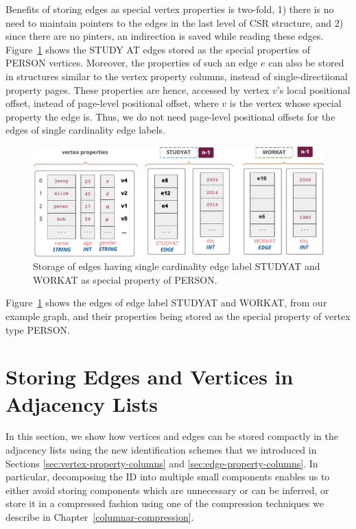 Benefits of storing edges as special vertex properties is two-fold, 1) there is no need to maintain pointers to the edges in the last level of CSR structure, and 2) since there are no pinters, an indirection is saved while reading these edges. Figure~\ref{fig:single-cardinality-cols} shows the STUDY AT edges stored as the special properties of PERSON vertices. Moreover, the properties of such an edge $e$ can also be stored in structures similar to the vertex property columns, instead of single-directiional property pages. These properties are hence, accessed by vertex $v$'s local positional offset, instead of page-level positional offset, where $v$ is the vertex whose special property the edge is. Thus, we do not need page-level positional offsets for the edges of single cardinality edge labels.

\begin{figure}
	\hfill\includegraphics[scale=0.78]{img/single-cardinality-cols}\hspace*{\fill}
	\captionsetup{justification=centering}
	\caption{Storage of edges having single cardinality edge label STUDYAT and WORKAT as special property of PERSON.}
	\label{fig:single-cardinality-cols}
\end{figure}

Figure~\ref{fig:single-cardinality-cols} shows the edges of edge label STUDYAT and WORKAT, from our example graph, and their properties being stored as the special property of vertex type PERSON. 

\section{Storing Edges and Vertices in Adjacency Lists}
\label{sec:storage-optimizations}

In this section, we show how vertices and edges can be stored compactly in the adjacency lists using the new identification schemes that we introduced in Sections \ref{sec:vertex-property-columns} and \ref{sec:edge-property-columns}. In particular, decomposing the ID into multiple small components enables us to either avoid storing components which are unnecessary or can be inferred, or store it in a compressed fashion using one of the compression techniques we describe in Chapter~\ref{columnar-compression}.

